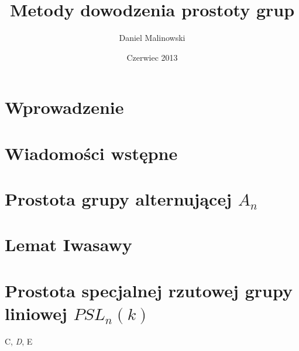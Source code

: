 \documentclass[licencjacka]{pracamgr}
\author{Daniel Malinowski}
\title{Metody dowodzenia prostoty grup}
\date{Czerwiec 2013}
\begin{document}
\maketitle

\begin{abstract}
\end{abstract}

\tableofcontents


\chapter*{Wprowadzenie}

\chapter{Wiadomości wstępne}

\chapter{Prostota grupy alternującej $A_n$}

\chapter{Lemat Iwasawy}

\chapter{Prostota specjalnej rzutowej grupy liniowej $PSL_n(k)$}


\begin{thebibliography}{99}

 C, \textit{D}, E


\end{thebibliography}
\end{document}
